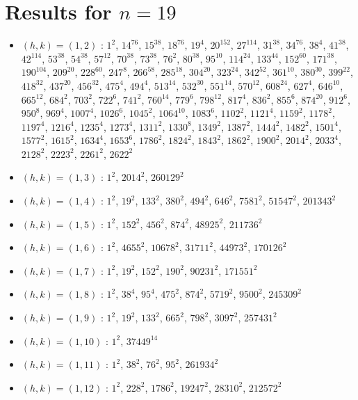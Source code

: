 \section{Results for $n=19$}
\begin{itemize}
\item $(h,k)=(1,2)$ : $1^{2}$, $14^{76}$, $15^{38}$, $18^{76}$, $19^{4}$, $20^{152}$, $27^{114}$, $31^{38}$, $34^{76}$, $38^{4}$, $41^{38}$, $42^{114}$, $53^{38}$, $54^{38}$, $57^{12}$, $70^{38}$, $73^{38}$, $76^{2}$, $80^{38}$, $95^{10}$, $114^{24}$, $133^{44}$, $152^{60}$, $171^{38}$, $190^{104}$, $209^{20}$, $228^{60}$, $247^{8}$, $266^{58}$, $285^{18}$, $304^{20}$, $323^{24}$, $342^{52}$, $361^{10}$, $380^{30}$, $399^{22}$, $418^{32}$, $437^{20}$, $456^{32}$, $475^{4}$, $494^{4}$, $513^{14}$, $532^{30}$, $551^{14}$, $570^{12}$, $608^{24}$, $627^{4}$, $646^{10}$, $665^{12}$, $684^{2}$, $703^{2}$, $722^{6}$, $741^{2}$, $760^{14}$, $779^{6}$, $798^{12}$, $817^{4}$, $836^{2}$, $855^{6}$, $874^{20}$, $912^{6}$, $950^{8}$, $969^{4}$, $1007^{4}$, $1026^{6}$, $1045^{2}$, $1064^{10}$, $1083^{6}$, $1102^{2}$, $1121^{4}$, $1159^{2}$, $1178^{2}$, $1197^{4}$, $1216^{4}$, $1235^{4}$, $1273^{4}$, $1311^{2}$, $1330^{8}$, $1349^{2}$, $1387^{2}$, $1444^{2}$, $1482^{2}$, $1501^{4}$, $1577^{2}$, $1615^{2}$, $1634^{4}$, $1653^{6}$, $1786^{2}$, $1824^{2}$, $1843^{2}$, $1862^{2}$, $1900^{2}$, $2014^{2}$, $2033^{4}$, $2128^{2}$, $2223^{2}$, $2261^{2}$, $2622^{2}$
\item $(h,k)=(1,3)$ : $1^{2}$, $2014^{2}$, $260129^{2}$
\item $(h,k)=(1,4)$ : $1^{2}$, $19^{2}$, $133^{2}$, $380^{2}$, $494^{2}$, $646^{2}$, $7581^{2}$, $51547^{2}$, $201343^{2}$
\item $(h,k)=(1,5)$ : $1^{2}$, $152^{2}$, $456^{2}$, $874^{2}$, $48925^{2}$, $211736^{2}$
\item $(h,k)=(1,6)$ : $1^{2}$, $4655^{2}$, $10678^{2}$, $31711^{2}$, $44973^{2}$, $170126^{2}$
\item $(h,k)=(1,7)$ : $1^{2}$, $19^{2}$, $152^{2}$, $190^{2}$, $90231^{2}$, $171551^{2}$
\item $(h,k)=(1,8)$ : $1^{2}$, $38^{4}$, $95^{4}$, $475^{2}$, $874^{2}$, $5719^{2}$, $9500^{2}$, $245309^{2}$
\item $(h,k)=(1,9)$ : $1^{2}$, $19^{2}$, $133^{2}$, $665^{2}$, $798^{2}$, $3097^{2}$, $257431^{2}$
\item $(h,k)=(1,10)$ : $1^{2}$, $37449^{14}$
\item $(h,k)=(1,11)$ : $1^{2}$, $38^{2}$, $76^{2}$, $95^{2}$, $261934^{2}$
\item $(h,k)=(1,12)$ : $1^{2}$, $228^{2}$, $1786^{2}$, $19247^{2}$, $28310^{2}$, $212572^{2}$

\end{itemize}
